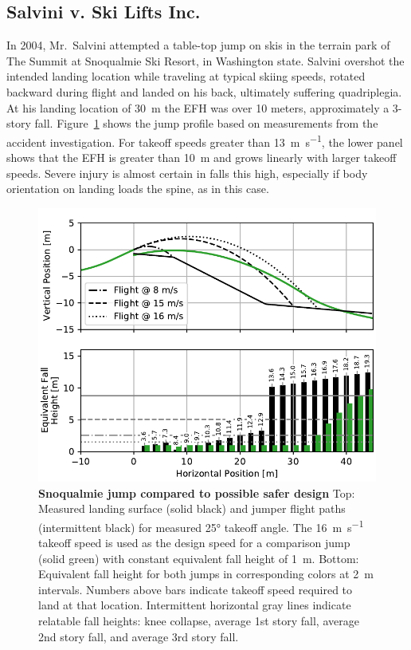 \documentclass[smallextended]{svjour3}       %
\begin{document}
\subsection{Salvini v. Ski Lifts Inc.}
\label{sec:salvini}
%
In 2004, Mr.~Salvini attempted a table-top jump on skis in the terrain park of
The Summit at Snoqualmie Ski Resort, in Washington state. Salvini overshot the
intended landing location while traveling at typical skiing speeds, rotated
backward during flight and landed on his back, ultimately suffering
quadriplegia. At his landing location of 30~\si{\meter} the EFH was over 10
meters, approximately a 3-story fall.  Figure~\ref{fig:salvini-v-snoqualmie}
shows the jump profile based on measurements from the accident investigation.
For takeoff speeds greater than 13~\si{\meter\per\second}, the lower panel
shows that the EFH is greater than 10~\si{\meter} and grows linearly with
larger takeoff speeds. Severe injury is almost certain in falls this high,
especially if body orientation on landing loads the spine, as in this case.
%
\begin{figure}
  \centering
  \includegraphics[width=5.25in]{figures/salvini-v-snoqualmie.pdf}
  \caption{\textbf{Snoqualmie jump compared to possible safer design}
  Top: Measured landing surface (solid black) and jumper flight paths
  (intermittent black) for measured 25\si{\degree} takeoff angle. The
  16~\si{\meter\per\second} takeoff speed is used as the design speed for a
  comparison jump (solid green) with constant equivalent fall height of
  1~\si{\meter}.
  Bottom: Equivalent fall height for both jumps in corresponding colors
  at 2~\si{\meter} intervals. Numbers above bars indicate takeoff speed
  required to land at that location.
  Intermittent horizontal gray lines indicate relatable fall heights: knee
  collapse, average 1st story fall, average 2nd story fall, and average 3rd
  story fall.
  }
  \label{fig:salvini-v-snoqualmie}
\end{figure}
\end{document}

